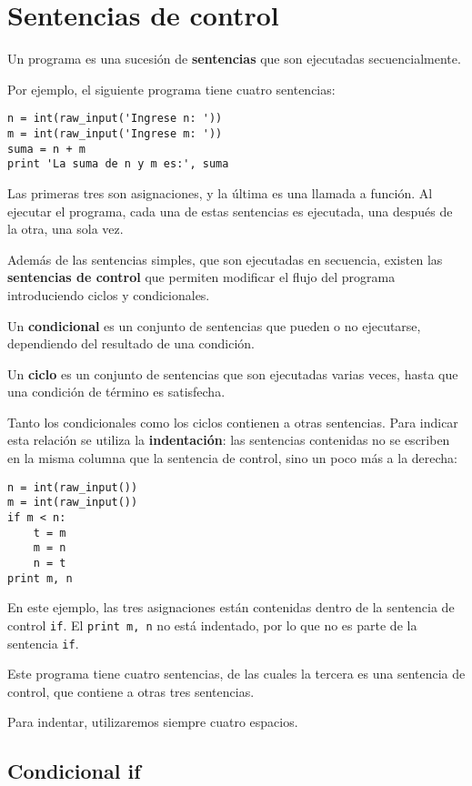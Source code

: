\chapter{Sentencias de control}

Un programa es una sucesión de \textbf{sentencias} que son ejecutadas
secuencialmente.

Por ejemplo, el siguiente programa tiene cuatro sentencias:

\begin{lstlisting}
n = int(raw_input('Ingrese n: '))
m = int(raw_input('Ingrese m: '))
suma = n + m
print 'La suma de n y m es:', suma
\end{lstlisting}

Las primeras tres son asignaciones, y la última es una llamada a
función. Al ejecutar el programa, cada una de estas sentencias es
ejecutada, una después de la otra, una sola vez.

Además de las sentencias simples, que son ejecutadas en secuencia,
existen las \textbf{sentencias de control} que permiten modificar el
flujo del programa introduciendo ciclos y condicionales.

Un \textbf{condicional} es un conjunto de sentencias que pueden o no
ejecutarse, dependiendo del resultado de una condición.

Un \textbf{ciclo} es un conjunto de sentencias que son ejecutadas varias
veces, hasta que una condición de término es satisfecha.

Tanto los condicionales como los ciclos contienen a otras sentencias.
Para indicar esta relación se utiliza la \textbf{indentación}: las
sentencias contenidas no se escriben en la misma columna que la
sentencia de control, sino un poco más a la derecha:

\begin{lstlisting}
n = int(raw_input())
m = int(raw_input())
if m < n:
    t = m
    m = n
    n = t
print m, n
\end{lstlisting}

En este ejemplo, las tres asignaciones están contenidas dentro de la
sentencia de control \lstinline!if!. El \lstinline!print m, n! no está
indentado, por lo que no es parte de la sentencia \lstinline!if!.

Este programa tiene cuatro sentencias, de las cuales la tercera es una
sentencia de control, que contiene a otras tres sentencias.

Para indentar, utilizaremos siempre cuatro espacios.

\section{Condicional if}


